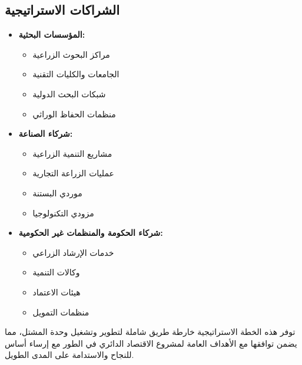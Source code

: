 \subsection{الشراكات الاستراتيجية}
\begin{itemize}
    \item \textbf{المؤسسات البحثية:}
    \begin{itemize}
        \item مراكز البحوث الزراعية
        \item الجامعات والكليات التقنية
        \item شبكات البحث الدولية
        \item منظمات الحفاظ الوراثي
    \end{itemize}
    
    \item \textbf{شركاء الصناعة:}
    \begin{itemize}
        \item مشاريع التنمية الزراعية
        \item عمليات الزراعة التجارية
        \item موردي البستنة
        \item مزودي التكنولوجيا
    \end{itemize}
    
    \item \textbf{شركاء الحكومة والمنظمات غير الحكومية:}
    \begin{itemize}
        \item خدمات الإرشاد الزراعي
        \item وكالات التنمية
        \item هيئات الاعتماد
        \item منظمات التمويل
    \end{itemize}
\end{itemize}

توفر هذه الخطة الاستراتيجية خارطة طريق شاملة لتطوير وتشغيل وحدة المشتل، مما يضمن توافقها مع الأهداف العامة لمشروع الاقتصاد الدائري في الطور مع إرساء أساس للنجاح والاستدامة على المدى الطويل. 